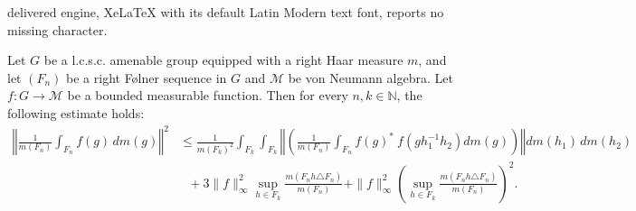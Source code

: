 \documentclass[10pt,a4paper]{amsart}
\newcommand{\CM}{\mathcal{M}}
\newcommand{\norm}[1]{\left\Vert#1\right\Vert}
\begin{document}
delivered engine, XeLaTeX with its default Latin Modern text font, reports no missing character.
\begin{lem}\label{Lemma_vand}
Let $G$ be a l.c.s.c. amenable group equipped with a right Haar measure $m$, and let $(F_n)$ be a right F\o lner sequence in $G$ and $\CM$ be von Neumann algebra. Let $f : G \to \CM$ be a bounded measurable function. Then for every $n, k \in \mathbb{N}$, the following estimate holds:
\begin{align}\label{Vand_inequality}
\norm{
\frac{1}{m(F_n)} \int_{F_n} f(g)\, dm(g)
}^2 &\leq 
\frac{1}{m(F_k)^2} \int_{F_k} \int_{F_k}
\norm{ \left( \frac{1}{m(F_n)} \int_{F_n}
f( g)^* ~ f( gh_{1}^{-1}h_2) dm(g) \right) }
dm(h_1)\, dm(h_2) \\
&~~~+ 3\|f\|_\infty^2 \sup_{h \in F_k}
\frac{m(F_nh \triangle F_n)}{m(F_n)}  +   \|f\|^2_\infty \left( \sup_{h \in F_k}
\frac{m(F_nh \triangle F_n)}{m(F_n)} \right)^2.
\end{align}

\end{lem}
\end{document}
